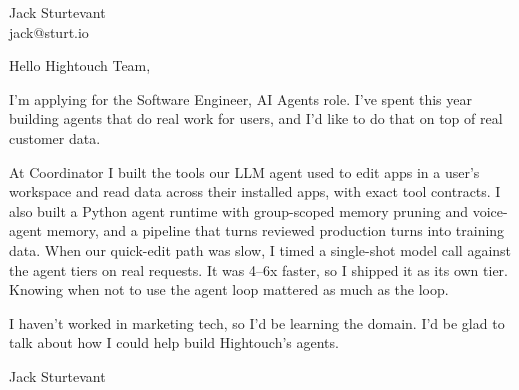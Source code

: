 \documentclass[11pt]{article}
\begin{document}
\raggedright

{\namefont\fontsize{20pt}{24pt}\selectfont Jack Sturtevant}\\[-0.3em]
jack@sturt.io

\vspace{1.2em}

Hello Hightouch Team,

I'm applying for the Software Engineer, AI Agents role. I've spent this year building agents that do real work for users, and I'd like to do that on top of real customer data.

At Coordinator I built the tools our LLM agent used to edit apps in a user's workspace and read data across their installed apps, with exact tool contracts. I also built a Python agent runtime with group-scoped memory pruning and voice-agent memory, and a pipeline that turns reviewed production turns into training data. When our quick-edit path was slow, I timed a single-shot model call against the agent tiers on real requests. It was 4--6x faster, so I shipped it as its own tier. Knowing when not to use the agent loop mattered as much as the loop.

I haven't worked in marketing tech, so I'd be learning the domain. I'd be glad to talk about how I could help build Hightouch's agents.

\vspace{0.6em}
Jack Sturtevant
\end{document}
